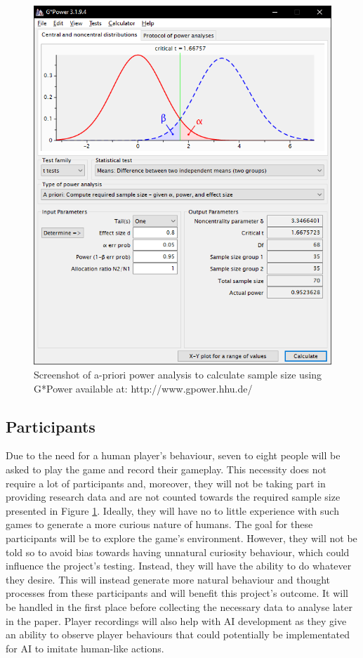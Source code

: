 \documentclass[journal]{IEEEtran}
\begin{document}
\begin{figure}
	\includegraphics[width=\linewidth]{Images/GPower.PNG}
	\caption{Screenshot of a-priori power analysis to calculate sample size using G*Power available at: http://www.gpower.hhu.de/}
	\label{fig:gpower}
\end{figure}

\subsection{Participants} %
Due to the need for a human player's behaviour, seven to eight people will be asked to play the game and record their gameplay. This necessity does not require a lot of participants and, moreover, they will not be taking part in providing research data and are not counted towards the required sample size presented in Figure \ref{fig:gpower}. Ideally, they will have no to little experience with such games to generate a more curious nature of humans. The goal for these participants will be to explore the game's environment. However, they will not be told so to avoid bias towards having unnatural curiosity behaviour, which could influence the project's testing. Instead, they will have the ability to do whatever they desire. This will instead generate more natural behaviour and thought processes from these participants and will benefit this project's outcome. It will be handled in the first place before collecting the necessary data to analyse later in the paper. Player recordings will also help with AI development as they give an ability to observe player behaviours that could potentially be implementated for AI to imitate human-like actions.
\end{document}
